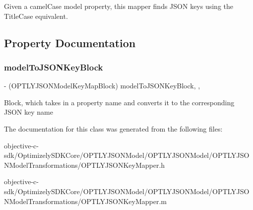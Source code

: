 Given a camel\+Case model property, this mapper finds J\+S\+ON keys using the Title\+Case equivalent. 

\subsection{Property Documentation}
\mbox{\label{interface_o_p_t_l_y_j_s_o_n_key_mapper_a3547786009a069bf90bd8963c55e0747}} 
\subsubsection{\texorpdfstring{model\+To\+J\+S\+O\+N\+Key\+Block}{modelToJSONKeyBlock}}
{\footnotesize\ttfamily -\/ (O\+P\+T\+L\+Y\+J\+S\+O\+N\+Model\+Key\+Map\+Block) model\+To\+J\+S\+O\+N\+Key\+Block\hspace{0.3cm}{\ttfamily [read]}, {\ttfamily [nonatomic]}, {\ttfamily [assign]}}

Block, which takes in a property name and converts it to the corresponding J\+S\+ON key name 

The documentation for this class was generated from the following files\+:\begin{DoxyCompactItemize}
\item 
objective-\/c-\/sdk/\+Optimizely\+S\+D\+K\+Core/\+O\+P\+T\+L\+Y\+J\+S\+O\+N\+Model/\+O\+P\+T\+L\+Y\+J\+S\+O\+N\+Model/\+O\+P\+T\+L\+Y\+J\+S\+O\+N\+Model\+Transformations/O\+P\+T\+L\+Y\+J\+S\+O\+N\+Key\+Mapper.\+h\item 
objective-\/c-\/sdk/\+Optimizely\+S\+D\+K\+Core/\+O\+P\+T\+L\+Y\+J\+S\+O\+N\+Model/\+O\+P\+T\+L\+Y\+J\+S\+O\+N\+Model/\+O\+P\+T\+L\+Y\+J\+S\+O\+N\+Model\+Transformations/O\+P\+T\+L\+Y\+J\+S\+O\+N\+Key\+Mapper.\+m\end{DoxyCompactItemize}
